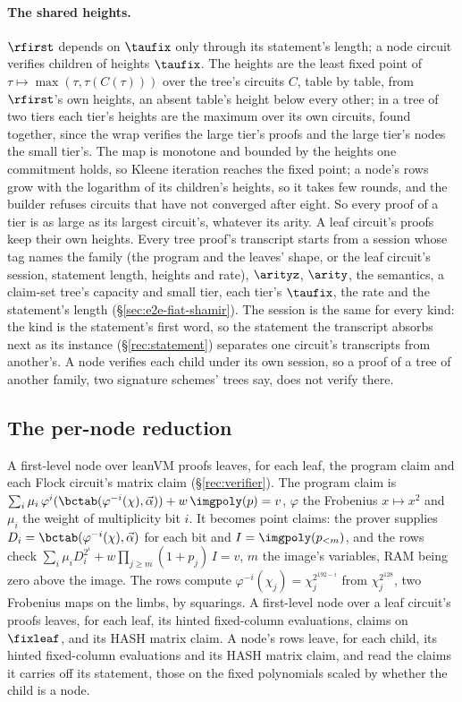 \paragraph{The shared heights.} $\rfirst$ depends on $\taufix$ only through its statement's length; a node circuit verifies children of heights $\taufix$. The heights are the least fixed point of $\tau\mapsto\max(\tau,\tau(C(\tau)))$ over the tree's circuits $C$, table by table, from $\rfirst$'s own heights, an absent table's height below every other; in a tree of two tiers each tier's heights are the maximum over its own circuits, found together, since the wrap verifies the large tier's proofs and the large tier's nodes the small tier's. The map is monotone and bounded by the heights one commitment holds, so Kleene iteration reaches the fixed point; a node's rows grow with the logarithm of its children's heights, so it takes few rounds, and the builder refuses circuits that have not converged after eight. So every proof of a tier is as large as its largest circuit's, whatever its arity. A leaf circuit's proofs keep their own heights. Every tree proof's transcript starts from a session whose tag names the family (the program and the leaves' shape, or the leaf circuit's session, statement length, heights and rate), $\arityz$, $\arity$, the semantics, a claim-set tree's capacity and small tier, each tier's $\taufix$, the rate and the statement's length (\S\ref{sec:e2e-fiat-shamir}). The session is the same for every kind: the kind is the statement's first word, so the statement the transcript absorbs next as its instance (\S\ref{rec:statement}) separates one circuit's transcripts from another's. A node verifies each child under its own session, so a proof of a tree of another family, two signature schemes' trees say, does not verify there.

\subsection{The per-node reduction}\label{rec:reduce}

A first-level node over leanVM proofs leaves, for each leaf, the program claim and each Flock circuit's matrix claim (\S\ref{rec:verifier}). The program claim is $\sum_i\mu_i\,\varphi^i(\bctab(\varphi^{-i}(\chi),\vec\alpha))+w\,\imgpoly(p)=v$, $\varphi$ the Frobenius $x\mapsto x^2$ and $\mu_i$ the weight of multiplicity bit $i$. It becomes point claims: the prover supplies $D_i=\bctab(\varphi^{-i}(\chi),\vec\alpha)$ for each bit and $I=\imgpoly(p_{<m})$, and the rows check $\sum_i\mu_iD_i^{2^i}+w\prod_{j\ge m}(1+p_j)\,I=v$, $m$ the image's variables, RAM being zero above the image. The rows compute $\varphi^{-i}(\chi_j)=\chi_j^{2^{192-i}}$ from $\chi_j^{2^{128}}$, two Frobenius maps on the limbs, by squarings. A first-level node over a leaf circuit's proofs leaves, for each leaf, its hinted fixed-column evaluations, claims on $\fixleaf$, and its \textsf{HASH} matrix claim. A node's rows leave, for each child, its hinted fixed-column evaluations and its \textsf{HASH} matrix claim, and read the claims it carries off its statement, those on the fixed polynomials scaled by whether the child is a node.

